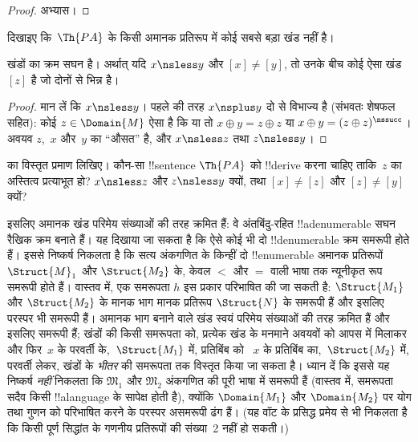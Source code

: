 \documentclass[../../../include/open-logic-section]{subfiles}
\begin{document}
\begin{proof}
अभ्यास।
\end{proof}

\begin{prob}
दिखाइए कि~$\Th{PA}$ के किसी अमानक प्रतिरूप में कोई सबसे बड़ा खंड नहीं है।
\end{prob}

\begin{prop}
खंडों का क्रम सघन है। अर्थात् यदि $x \nsless y$ और $[x] \neq [y]$, तो
उनके बीच कोई ऐसा खंड $[z]$ है जो दोनों से भिन्न है।
\end{prop}

\begin{proof}
मान लें कि $x \nsless y$। पहले की तरह $x \nsplus y$ दो से विभाज्य है
(संभवतः शेषफल सहित): कोई $z \in \Domain{M}$ ऐसा है कि या तो
$x \oplus y = z \oplus z$ या $x \oplus y = (z \oplus
z)^\nssucc$। अवयव $z$,~$x$ और~$y$ का “औसत” है, और $x
\nsless z$ तथा
$z \nsless y$।
\end{proof}

\begin{prob}
 का विस्तृत प्रमाण लिखिए।
कौन-सा !!{sentence} $\Th{PA}$ को !!{derive} करना चाहिए ताकि~$z$ का अस्तित्व
प्रत्याभूत हो? $x \nsless z$ और $z \nsless y$ क्यों, तथा
$[x] \neq [z]$ और $[z]
\neq [y]$ क्यों?
\end{prob}

\begin{explain}
इसलिए अमानक खंड परिमेय संख्याओं की तरह क्रमित हैं: वे अंतबिंदु-रहित
!!a{denumerable} सघन रैखिक क्रम बनाते हैं। यह दिखाया जा सकता है कि ऐसे कोई
भी दो !!{denumerable} क्रम समरूपी होते हैं। इससे निष्कर्ष निकलता है
कि सत्य अंकगणित के किन्हीं दो !!{enumerable} अमानक प्रतिरूपों $\Struct{M}_1$ और
$\Struct{M_2}$ के, केवल $<$ और $=$ वाली भाषा तक न्यूनीकृत रूप समरूपी होते
हैं। वास्तव में, एक समरूपता $h$
इस प्रकार परिभाषित की जा सकती है: $\Struct{M_1}$ और $\Struct{M_2}$ के मानक
भाग मानक प्रतिरूप $\Struct{N}$ के समरूपी हैं और इसलिए परस्पर भी समरूपी हैं।
अमानक भाग बनाने वाले खंड स्वयं परिमेय संख्याओं की तरह क्रमित हैं और इसलिए
समरूपी हैं; खंडों की किसी समरूपता को, प्रत्येक खंड के मनमाने अवयवों को आपस
में मिलाकर और फिर~$x$ के परवर्ती के,~$\Struct{M_1}$ में, प्रतिबिंब को
~$x$ के प्रतिबिंब का,~$\Struct{M_2}$ में, परवर्ती लेकर, खंडों के
\emph{भीतर} की समरूपता तक विस्तृत किया जा सकता है। ध्यान दें कि इससे यह
निष्कर्ष \emph{नहीं} निकलता कि $\mathfrak{M}_1$ और $\mathfrak{M}_2$
अंकगणित की पूरी भाषा में समरूपी हैं (वास्तव में, समरूपता सदैव किसी
!!a{language} के सापेक्ष होती है), क्योंकि $\Domain{M_1}$ और
$\Domain{M_2}$ पर योग तथा गुणन को परिभाषित करने के परस्पर असमरूपी ढंग हैं।
(यह वॉट के प्रसिद्ध प्रमेय से भी निकलता है कि किसी पूर्ण सिद्धांत के गणनीय
प्रतिरूपों की संख्या~2 नहीं हो सकती।)
\end{explain}
\end{document}
